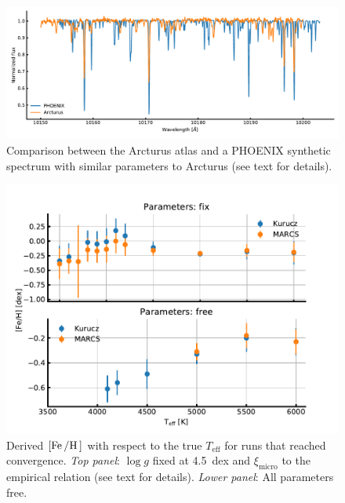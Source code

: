\begin{figure}[htpb!]
    \centering
    \includegraphics[width=1.0\linewidth]{figures/arcturus_phoenix.pdf}
    \caption{Comparison between the Arcturus atlas and a PHOENIX synthetic spectrum with similar
             parameters to Arcturus (see text for details).}
    \label{fig:arcturus_phoenix}
\end{figure}

\begin{figure}[htpb!]
    \centering
    \includegraphics[width=1.0\linewidth]{figures/FeH_simulated.pdf}
    \caption{Derived $[\ion{Fe}/\ion{H}]$ with respect to the true $T_\mathrm{eff}$ for runs that
             reached convergence.
             \emph{Top panel}: $\log g$ fixed at \SI{4.5}{dex} and $\xi_\mathrm{micro}$ to the
             empirical relation (see text for details).
             \emph{Lower panel}: All parameters free.}
    \label{fig:feh_simulation}
\end{figure}
